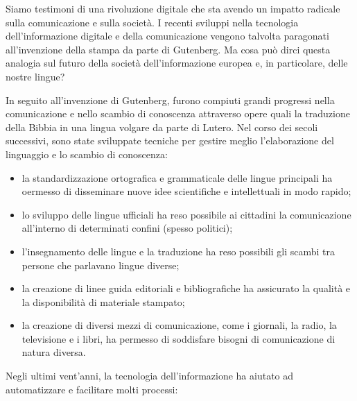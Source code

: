 \begin{multicols}{2}

Siamo testimoni di una rivoluzione digitale che sta avendo un impatto radicale
sulla comunicazione e sulla societ\`{a}. I recenti sviluppi nella tecnologia
dell'informazione digitale e della comunicazione vengono talvolta paragonati
all'invenzione della stampa da parte di Gutenberg. Ma cosa pu\`{o} dirci
questa analogia sul futuro della societ\`{a} dell'informazione europea e, in
particolare, delle nostre lingue?



In seguito all'invenzione di Gutenberg, furono compiuti grandi progressi
nella comunicazione e nello scambio di conoscenza attraverso opere quali la
traduzione della Bibbia in una lingua volgare da parte di Lutero. Nel corso
dei secoli successivi, sono state sviluppate tecniche per gestire meglio
l'elaborazione del linguaggio e lo scambio di conoscenza:\

\begin{itemize}
\item la standardizzazione ortografica e grammaticale delle lingue principali
  ha oermesso di disseminare nuove idee scientifiche e intellettuali in modo
  rapido;
\item lo sviluppo delle lingue ufficiali ha reso possibile ai cittadini la
  comunicazione all'interno di determinati confini (spesso politici);
\item l'insegnamento delle lingue e la traduzione ha reso possibili gli scambi tra
  persone che parlavano lingue diverse;
\item la creazione di linee guida editoriali e bibliografiche ha assicurato la
  qualit\`{a} e la disponibilit\`{a} di materiale stampato;
\item la creazione di diversi mezzi di comunicazione, come i giornali, la radio,
  la televisione e i libri, ha permesso di soddisfare bisogni di comunicazione di
  natura diversa.
\end{itemize}

Negli ultimi vent'anni, la tecnologia dell'informazione ha aiutato ad
automatizzare e facilitare molti processi:


\end{multicols}
